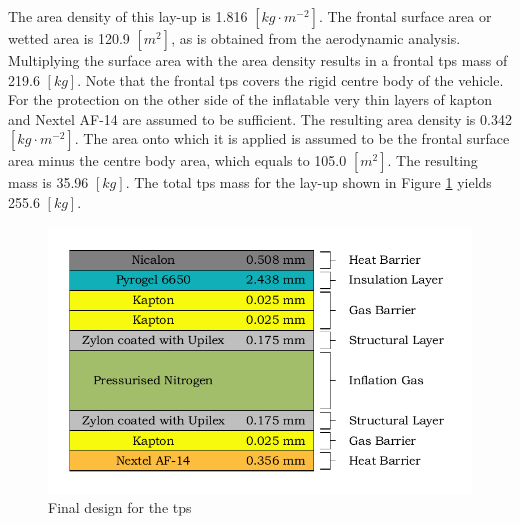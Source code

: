 The area density of this lay-up is 1.816 $\left[kg\cdot m^{-2}\right]$. The frontal surface area or wetted area is 120.9 $\left[m^2\right]$, as is obtained from the aerodynamic analysis. Multiplying the surface area with the area density results in a frontal \gls{tps} mass of 219.6 $\left[kg\right]$. Note that the frontal \gls{tps} covers the rigid centre body of the vehicle. For the protection on the other side of the inflatable very thin layers of kapton and Nextel AF-14 are assumed to be sufficient. The resulting area density is 0.342 $\left[kg\cdot m^{-2}\right]$. The area onto which it is applied is assumed to be the frontal surface area minus the centre body area, which equals to 105.0 $\left[m^2\right]$. The resulting mass is 35.96 $\left[kg\right]$. The total \gls{tps} mass for the lay-up shown in Figure \ref{fig:finallayup} yields 255.6 $\left[kg\right]$. 

\begin{figure}[H]
	\centering
	\includegraphics{./Figure/Thermal/finallayup.pdf}
	\caption{Final design for the \acrlong{tps}}
	\label{fig:finallayup}
\end{figure}
